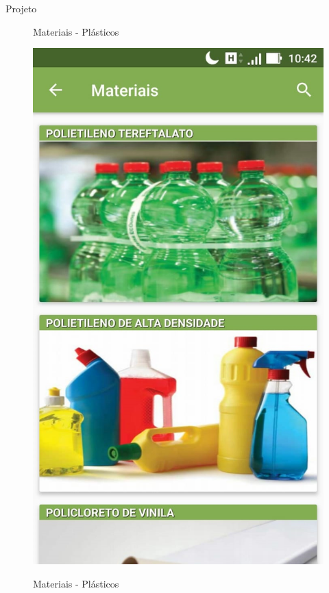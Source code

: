 \documentclass[
	12pt,				%
	openright,			%
	twoside,			%
	a4paper,			%
	english,			%
	french,				%
	spanish,			%
	brazil				%
	]{abntex2}
\begin{document}
\begin{chapter}{Projeto}
    \begin{figure}[htb]    
 \centering
  \begin{minipage}{0.45\textwidth}
    \centering
    \caption{Materiais -  Plásticos}
    \includegraphics[scale=0.35]{media/tela_material_act_1.jpg}
     \label{fig:tela_material_act_1}
  \end{minipage}
  \hfill
  \begin{minipage}{0.45\textwidth}
    \centering
    \caption{Materiais -  Plásticos}

\end{minipage}
\end{figure}
\end{chapter}
\end{document}

